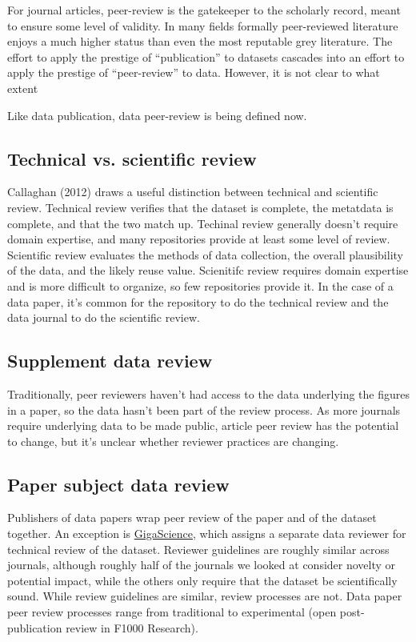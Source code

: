 \documentclass[10pt,a4paper,twocolumn]{article}
\begin{document}
For journal articles, peer-review is the gatekeeper to the scholarly record, meant to ensure some level of validity.
In many fields formally peer-reviewed literature enjoys a much higher status than even the most reputable grey literature.
The effort to apply the prestige of ``publication'' to datasets cascades into an effort to apply the prestige of ``peer-review'' to data.
However, it is not clear to what extent 



Like data publication, data peer-review is being defined now.



\subsection*{Technical vs. scientific review}
Callaghan (2012)\cite{sarah_callaghan_making_2012} draws a useful distinction between technical and scientific review. 
Technical review verifies that the dataset is complete, the metatdata is complete, and that the two match up.  
Techinal review generally doesn't require domain expertise, and many repositories provide at least some level of review. 
Scientific review evaluates the methods of data collection, the overall plausibility of the data, and the likely reuse value. 
Scienitifc review requires domain expertise and is more difficult to organize, so few repositories provide it.
In the case of a data paper, it's common for the repository to do the technical review and the data journal to do the scientific review.

\subsection*{Supplement data review}
Traditionally, peer reviewers haven't had access to the data underlying the figures in a paper, so the data hasn't been part of the review process.
As more journals require underlying data to be made public, article peer review has the potential to change, but it's unclear whether reviewer practices are changing.

\subsection*{Paper subject data review}
Publishers of data papers wrap peer review of the paper and of the dataset together. 
An exception is \href{http://www.gigasciencejournal.com/}{GigaScience}, which assigns a separate data reviewer for technical review of the dataset. 
Reviewer guidelines are roughly similar across journals, although roughly half of the journals we looked at consider novelty or potential impact, while the others only require that the dataset be scientifically sound.
While review guidelines are similar, review processes are not. 
Data paper peer review processes range from traditional to experimental (open post-publication review in F1000 Research).
\end{document}
